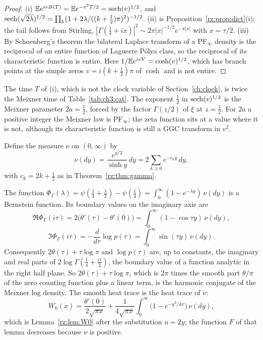 \begin{proof}
(i) $\mathbb{E} e^{ivB(T)}=\mathbb{E} e^{-v^2T/2}=\operatorname{sech}(v)^{1/2}$, and $\operatorname{sech}(\sqrt{2\lambda})^{1/2}=\prod_k(1+2\lambda/((k+\frac12)\pi)^2)^{-1/2}$. (ii) is Proposition~\ref{rz:prop:dict}(i); the tail follows from Stirling, $|\Gamma(\frac14+ix)|^2\sim2\pi|x|^{-1/2}e^{-\pi|x|}$ with $x=\tau/2$. (iii) By Schoenberg's theorem \cite[Theorem 1]{Schoenberg51} the bilateral Laplace transform of a PF$_\infty$ density is the reciprocal of an entire function of Laguerre P\'olya class, so the reciprocal of its characteristic function is entire. Here $1/\mathbb{E} e^{ivY}=\cosh(v)^{1/2}$, which has branch points at the simple zeros $v=i(k+\frac12)\pi$ of $\cosh$ and is not entire.
\end{proof}

The time $T$ of (i), which is not the clock variable of Section~\ref{ch:clock}, is twice the Meixner time of Table~\ref{tab:ch3:cat}. The exponent $\frac12$ in $\operatorname{sech}(v)^{1/2}$ is the Meixner parameter $2a=\frac12$, forced by the factor $\Gamma(z/2)$ of $\xi$ at $z=\frac12$. For $2a$ a positive integer the Meixner law is PF$_\infty$; the zeta function sits at a value where it is not, although its characteristic function is still a GGC transform in $v^2$.

Define the measure $\nu$ on $(0,\infty)$ by
\[
\nu(dy)=\frac{e^{y/2}}{\sinh y}\,dy=2\sum_{k\ge0}e^{-c_ky}\,dy ,
\]
with $c_k=2k+\frac12$ as in Theorem~\ref{rz:thm:gamma}.

\begin{proposition}\label{rz:prop:bernstein}
The function $\Phi_\Gamma(\lambda)=\psi(\frac14+\frac\lambda2)-\psi(\frac14)=\int_0^\infty(1-e^{-\lambda y})\,\nu(dy)$ is a Bernstein function. Its boundary values on the imaginary axis are
\[
\Re\Phi_\Gamma(i\tau)=2\bigl(\theta'(\tau)-\theta'(0)\bigr)=\int_0^\infty(1-\cos\tau y)\,\nu(dy),
\]
\[
\Im\Phi_\Gamma(i\tau)=-\frac{d}{d\tau}\log p(\tau)=\int_0^\infty\sin(\tau y)\,\nu(dy).
\]
Consequently $2\theta(\tau)+\tau\log\pi$ and $\log p(\tau)$ are, up to constants, the imaginary and real parts of $2\log\Gamma(\frac14+\frac{i\tau}2)$, the boundary value of a function analytic in the right half plane. So $2\theta(\tau)+\tau\log\pi$, which is $2\pi$ times the smooth part $\theta/\pi$ of the zero counting function plus a linear term, is the harmonic conjugate of the Meixner log density. The smooth heat trace is the heat trace of $\nu$:
\[
W_0(x)=\frac{\theta'(0)}{2\sqrt{\pi x}}+\frac{1}{4\sqrt{\pi x}}\int_0^\infty\bigl(1-e^{-y^2/4x}\bigr)\,\nu(dy),
\]
which is Lemma~\ref{rz:lem:W0} after the substitution $u=2y$; the function $F$ of that lemma decreases because $\nu$ is positive.
\end{proposition}

